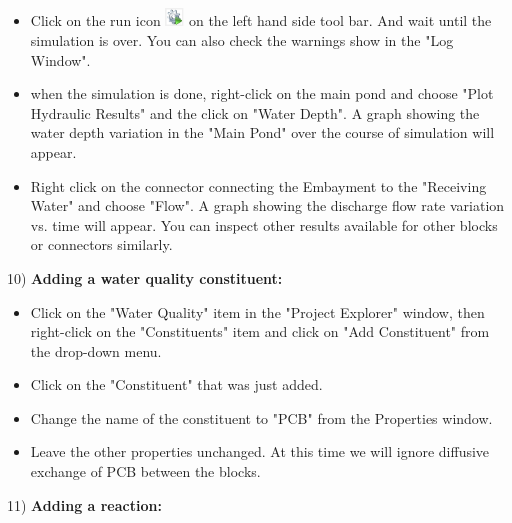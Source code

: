\begin{itemize}
\item Click on the run icon \includegraphics[width=0.5cm]{Icons/run_icon.png} on the left hand side tool bar. And wait until the simulation is over. You can also check the warnings show in the "Log Window". 
\item when the simulation is done, right-click on the main pond and choose "Plot Hydraulic Results" and the click on "Water Depth". A graph showing the water depth variation in the "Main Pond" over the course of simulation will appear. 
\item Right click on the connector connecting the Embayment to the "Receiving Water" and choose "Flow". A graph showing the discharge flow rate variation vs. time will appear. You can inspect other results available for other blocks or connectors similarly. 
\end{itemize}
10) \textbf{Adding a water quality constituent: }
\begin{itemize}
\item Click on the "Water Quality" item in the "Project Explorer" window, then right-click on the "Constituents" item and click on "Add Constituent" from the drop-down menu.
\item Click on the "Constituent" that was just added.
\item Change the name of the constituent to "PCB" from the Properties window. 
\item Leave the other properties unchanged. At this time we will ignore diffusive exchange of PCB between the blocks. 
\end{itemize}
11) \textbf{Adding a reaction: }
